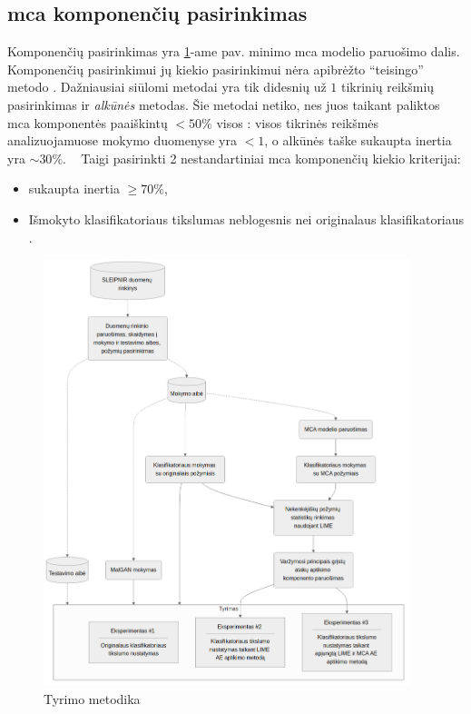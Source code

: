 \subsection{\gls{mca} komponenčių pasirinkimas}
Komponenčių pasirinkimas yra \ref{fig:methodology}-ame pav. minimo \gls{mca} modelio paruošimo dalis. Komponenčių pasirinkimui \ty jų kiekio pasirinkimui nėra apibrėžto \enquote{teisingo} metodo \cite{abdiPrincipalComponentAnalysis2010}. Dažniausiai siūlomi metodai yra tik didesnių už $1$ tikrinių reikšmių pasirinkimas ir \textit{alkūnės}  metodas. Šie metodai netiko, nes juos taikant paliktos \gls{mca} komponentės paaiškintų $<50\%$ visos : visos tikrinės reikšmės analizuojamuose mokymo duomenyse yra $<1$, o alkūnės taške sukaupta \gls{inertia} yra $\sim 30\%$. \TODO~ Taigi pasirinkti 2 nestandartiniai \gls{mca} komponenčių kiekio kriterijai: 
\begin{itemize}
    \item sukaupta \gls{inertia} $\ge 70\%$,
    \item Išmokyto klasifikatoriaus tikslumas neblogesnis nei originalaus klasifikatoriaus \TODO.
\end{itemize}

\begin{figure}[h]
    \centering
    \includegraphics[width=0.95\textwidth]{images/methodology.png}
    \caption{Tyrimo metodika}
    \label{fig:methodology}
\end{figure}
